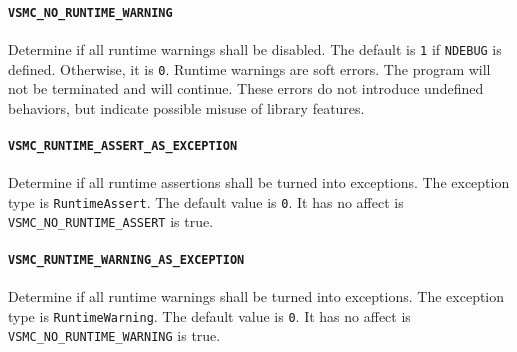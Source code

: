 \paragraph{\texttt{VSMC\_NO\_RUNTIME\_WARNING}} Determine if all runtime
warnings shall be disabled. The default is \verb|1| if \verb|NDEBUG| is
defined. Otherwise, it is \verb|0|. Runtime warnings are soft errors. The
program will not be terminated and will continue. These errors do not introduce
undefined behaviors, but indicate possible misuse of library features.

\paragraph{\texttt{VSMC\_RUNTIME\_ASSERT\_AS\_EXCEPTION}} Determine if all
runtime assertions shall be turned into exceptions. The exception type is
\verb|RuntimeAssert|. The default value is \verb|0|. It has no affect is
\verb|VSMC_NO_RUNTIME_ASSERT| is true.

\paragraph{\texttt{VSMC\_RUNTIME\_WARNING\_AS\_EXCEPTION}} Determine if all
runtime warnings shall be turned into exceptions. The exception type is
\verb|RuntimeWarning|. The default value is \verb|0|. It has no affect is
\verb|VSMC_NO_RUNTIME_WARNING| is true.
